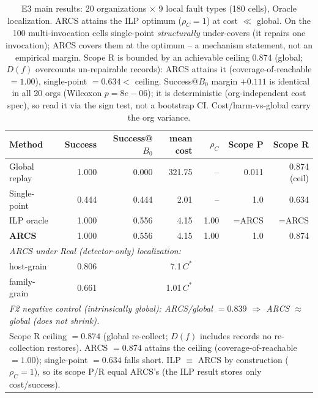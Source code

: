 \begin{table}[t]\centering\small
\caption{E3 main results: 20 organizations $\times$ 9 local fault types (180 cells), Oracle localization. ARCS attains the ILP optimum ($\rho_C\!=\!1$) at cost $\ll$ global. On the 100 multi-invocation cells single-point \emph{structurally} under-covers (it repairs one invocation); ARCS covers them at the optimum -- a mechanism statement, not an empirical margin. Scope R is bounded by an achievable ceiling 0.874 (global; $D(f)$ overcounts un-repairable records): ARCS attains it (coverage-of-reachable $=1.00$), single-point $=0.634<$ ceiling. Success@$B_0$ margin $+0.111$ is identical in all 20 orgs (Wilcoxon $p=8e-06$); it is deterministic (org-independent cost spec), so read it via the sign test, not a bootstrap CI. Cost/harm-vs-global carry the org variance.}
\label{tab:e3-main}
\begin{tabular}{lrrrrrr}\toprule
Method & Success & Success@$B_0$ & mean cost & $\rho_C$ & Scope P & Scope R\\\midrule
Global replay & 1.000 & 0.000 & 321.75 & -- & 0.011 & 0.874 (ceil)\\
Single-point & 0.444 & 0.444 & 2.01 & -- & 1.0 & 0.634\\
ILP oracle & 1.000 & 0.556 & 4.15 & 1.00 & =ARCS & =ARCS\\
\textbf{ARCS} & 1.000 & 0.556 & 4.15 & 1.00 & 1.0 & 0.874\\
\midrule
\multicolumn{7}{l}{\emph{ARCS under Real (detector-only) localization:}}\\
\quad host-grain & 0.806 &  & 7.1\,$C^*$ &  &  & \\
\quad family-grain & 0.661 &  & 1.01\,$C^*$ &  &  & \\
\midrule
\multicolumn{7}{l}{\emph{F2 negative control (intrinsically global): ARCS/global $=0.839$ $\Rightarrow$ ARCS $\approx$ global (does not shrink).}}\\
\midrule
\multicolumn{7}{p{.95\linewidth}}{\footnotesize Scope R ceiling $=0.874$ (global re-collect; $D(f)$ includes records no re-collection restores). ARCS $=0.874$ attains the ceiling (coverage-of-reachable $=1.00$); single-point $=0.634$ falls short. ILP $\equiv$ ARCS by construction ($\rho_C=1$), so its scope P/R equal ARCS's (the ILP result stores only cost/success).}\\
\bottomrule\end{tabular}\end{table}
